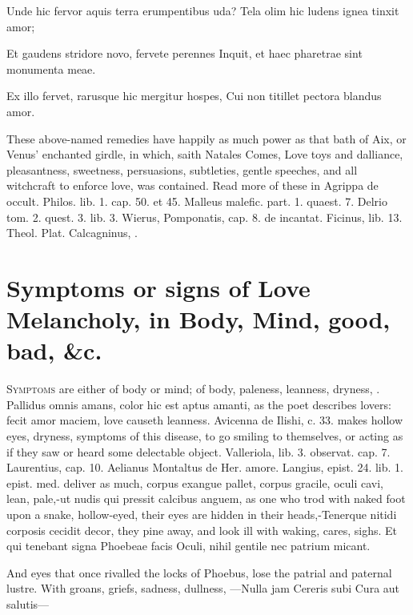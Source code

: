 {Unde hic fervor aquis terra erumpentibus uda?
Tela olim hic ludens ignea tinxit amor;

Et gaudens stridore novo, fervete perennes
Inquit, et haec pharetrae sint monumenta meae.

Ex illo fervet, rarusque hic mergitur hospes,
Cui non titillet pectora blandus amor.

These above-named remedies have happily as much power as that bath of
Aix, or Venus' enchanted girdle, in which, saith Natales Comes, Love
toys and dalliance, pleasantness, sweetness, persuasions, subtleties,
gentle speeches, and all witchcraft to enforce love, was contained.
Read more of these in Agrippa de occult. Philos. lib. 1. cap. 50. et
45. Malleus malefic. part. 1. quaest. 7. Delrio tom. 2. quest. 3. lib.
3. Wierus, Pomponatis, cap. 8. de incantat. Ficinus, lib. 13. Theol.
Plat. Calcagninus, \etc{}.


\section[Symptoms or signs of Love Melancholy]{Symptoms or signs of Love Melancholy, in Body, Mind, good, bad, \&c.}

\lettrine{S}{ymptoms} are either of body or mind; of body, paleness, leanness,
dryness, \etc{}. Pallidus omnis amans, color hic est aptus amanti, as
the poet describes lovers: fecit amor maciem, love causeth leanness.
 Avicenna de Ilishi, c. 33. makes hollow eyes, dryness, symptoms
of this disease, to go smiling to themselves, or acting as if they saw
or heard some delectable object. Valleriola, lib. 3. observat. cap. 7.
Laurentius, cap. 10. Aelianus Montaltus de Her. amore. Langius, epist.
24. lib. 1. epist. med. deliver as much, corpus exangue pallet, corpus
gracile, oculi cavi, lean, pale,-ut nudis qui pressit calcibus anguem,
as one who trod with naked foot upon a snake, hollow-eyed, their eyes
are hidden in their heads,-Tenerque nitidi corposis cecidit
decor, they pine away, and look ill with waking, cares, sighs.
Et qui tenebant signa Phoebeae facis
Oculi, nihil gentile nec patrium micant.

And eyes that once rivalled the locks of Phoebus, lose the patrial and
paternal lustre. With groans, griefs, sadness, dullness,
---Nulla jam Cereris subi
Cura aut salutis---

}
